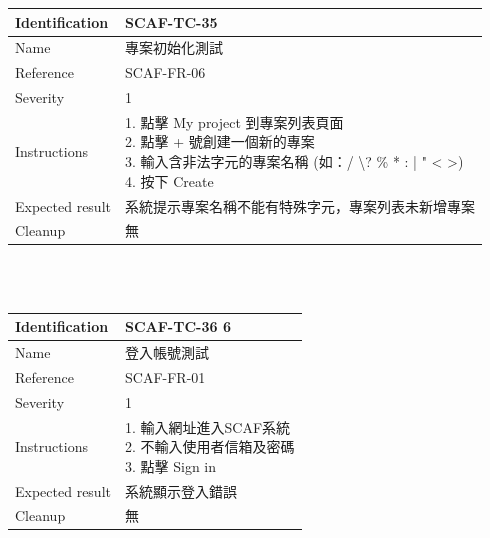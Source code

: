 \documentclass{report}
\begin{document}
\begin{tabularx}{\textwidth}{
  |p{}%
  |p{}|%
  }
  \hline
  \centering Identification &  SCAF-TC-35 \\
  \hline
  \centering Name & 專案初始化測試 \\
  \hline
  \centering Reference & SCAF-FR-06 \\
  \hline
  \centering Severity & 1 \\
  \hline
  \centering Instructions & 
  \makecell[l]{
    1. 點擊 My project 到專案列表頁面 \\
    2. 點擊 + 號創建一個新的專案 \\
    3. 輸入含非法字元的專案名稱 
    (如：/ \textbackslash ? \% * : |  " < >) \\
    4. 按下 Create
  }\\
  \hline
  \centering Expected result & 系統提示專案名稱不能有特殊字元，專案列表未新增專案 \\
  \hline
  \centering Cleanup & 無 \\
  \hline
\end{tabularx}
\\
\newline
\\
\begin{tabularx}{\textwidth}{
  |p{}%
  |p{}|%
  }
  \hline
  \centering Identification &  SCAF-TC-36
  6 \\
  \hline
  \centering Name & 登入帳號測試 \\
  \hline
  \centering Reference & SCAF-FR-01 \\
  \hline
  \centering Severity & 1 \\
  \hline
  \centering Instructions & 
  \makecell[l]{
    1. 輸入網址進入SCAF系統 \\
    2. 不輸入使用者信箱及密碼 \\
    3. 點擊 Sign in
  }\\
  \hline
  \centering Expected result & 系統顯示登入錯誤 \\
  \hline
  \centering Cleanup & 無 \\
  \hline
\end{tabularx}
\\
\newline
\\
\end{document}
